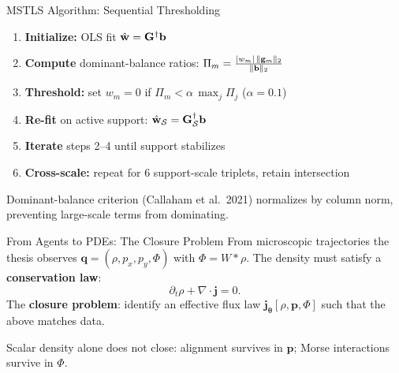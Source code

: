 \begin{frame}[noframenumbering]{MSTLS Algorithm: Sequential Thresholding}

\begin{enumerate}
  \item \textbf{Initialize:} OLS fit $\hat{\mathbf{w}} = \mathbf{G}^\dagger\mathbf{b}$
  \item \textbf{Compute} dominant-balance ratios:
    $\Pi_m = \frac{|w_m|\,\|\mathbf{g}_m\|_2}{\|\mathbf{b}\|_2}$
  \item \textbf{Threshold:} set $w_m{=}0$ if $\Pi_m < \alpha\,\max_j\Pi_j$ \quad ($\alpha{=}0.1$)
  \item \textbf{Re-fit} on active support: $\hat{\mathbf{w}}_{\mathcal{S}} = \mathbf{G}_{\mathcal{S}}^\dagger\mathbf{b}$
  \item \textbf{Iterate} steps 2--4 until support stabilizes
  \item \textbf{Cross-scale:} repeat for 6 support-scale triplets, retain intersection
\end{enumerate}

\bigskip
Dominant-balance criterion (Callaham et al.\ 2021) normalizes by column norm, preventing large-scale terms from dominating.
\end{frame}


\begin{frame}[noframenumbering,shrink=6]{From Agents to PDEs: The Closure Problem}
\small
From microscopic trajectories the thesis observes $\mathbf{q}=(\rho,p_x,p_y,\Phi)$
with $\Phi=W*\rho$.
The density must satisfy a \textbf{conservation law}:
\[ \partial_t\rho + \nabla\!\cdot\mathbf{j}=0. \]
The \textbf{closure problem}: identify an effective flux law
$\mathbf{j}_{\boldsymbol\theta}[\rho,\mathbf{p},\Phi]$
such that the above matches data.

\medskip Scalar density alone does not close: alignment survives in $\mathbf{p}$; Morse interactions survive in $\Phi$.
\end{frame}

